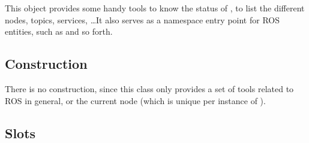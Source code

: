 This object provides some handy tools to know the status of ,
to list the different nodes, topics, services, \ldots  It also serves as a
namespace entry point for ROS entities, such as  and so
forth.

\subsection{Construction}

There is no construction, since this class only provides a set of tools
related to ROS in general, or the current node (which is unique per instance
of \urbi).

\subsection{Slots}

